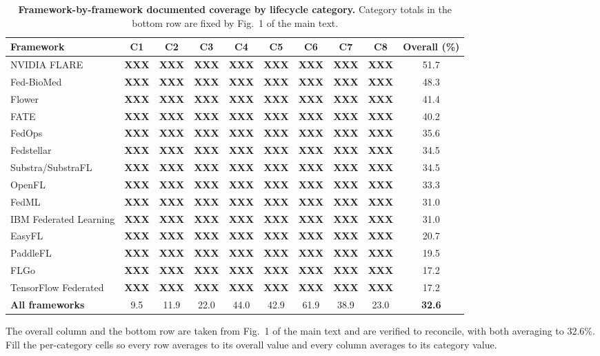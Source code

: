 \documentclass[10pt,a4paper]{article}
\newcommand{\XXX}{{\color{tkred}\textbf{XXX}}}
\begin{document}
\vspace{4pt}
\begin{table}[h]
\centering
\caption{\textbf{Framework-by-framework documented coverage by lifecycle category.} Category totals in the bottom row are fixed by Fig.~1 of the main text.}
\label{tab:fwscores}
{\scriptsize
\begin{tabular}{@{}lccccccccc@{}}
\toprule
\textbf{Framework} & \textbf{C1} & \textbf{C2} & \textbf{C3} & \textbf{C4} & \textbf{C5} & \textbf{C6} & \textbf{C7} & \textbf{C8} & \textbf{Overall (\%)}\\
\midrule
NVIDIA FLARE & \XXX & \XXX & \XXX & \XXX & \XXX & \XXX & \XXX & \XXX & 51.7\\
Fed-BioMed & \XXX & \XXX & \XXX & \XXX & \XXX & \XXX & \XXX & \XXX & 48.3\\
Flower & \XXX & \XXX & \XXX & \XXX & \XXX & \XXX & \XXX & \XXX & 41.4\\
FATE & \XXX & \XXX & \XXX & \XXX & \XXX & \XXX & \XXX & \XXX & 40.2\\
FedOps & \XXX & \XXX & \XXX & \XXX & \XXX & \XXX & \XXX & \XXX & 35.6\\
Fedstellar & \XXX & \XXX & \XXX & \XXX & \XXX & \XXX & \XXX & \XXX & 34.5\\
Substra/SubstraFL & \XXX & \XXX & \XXX & \XXX & \XXX & \XXX & \XXX & \XXX & 34.5\\
OpenFL & \XXX & \XXX & \XXX & \XXX & \XXX & \XXX & \XXX & \XXX & 33.3\\
FedML & \XXX & \XXX & \XXX & \XXX & \XXX & \XXX & \XXX & \XXX & 31.0\\
IBM Federated Learning & \XXX & \XXX & \XXX & \XXX & \XXX & \XXX & \XXX & \XXX & 31.0\\
EasyFL & \XXX & \XXX & \XXX & \XXX & \XXX & \XXX & \XXX & \XXX & 20.7\\
PaddleFL & \XXX & \XXX & \XXX & \XXX & \XXX & \XXX & \XXX & \XXX & 19.5\\
FLGo & \XXX & \XXX & \XXX & \XXX & \XXX & \XXX & \XXX & \XXX & 17.2\\
TensorFlow Federated & \XXX & \XXX & \XXX & \XXX & \XXX & \XXX & \XXX & \XXX & 17.2\\
\midrule
\textbf{All frameworks} & 9.5 & 11.9 & 22.0 & 44.0 & 42.9 & 61.9 & 38.9 & 23.0 & \textbf{32.6}\\
\bottomrule
\end{tabular}}
\end{table}

\vspace{4pt}
The overall column and the bottom row are taken from Fig.~1 of the main text and are
verified to reconcile, with both averaging to 32.6\%. Fill the per-category cells so
every row averages to its overall value and every column averages to its category value.
\end{document}
